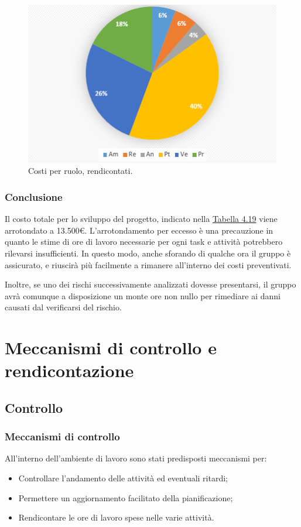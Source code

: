 \documentclass[a4paper]{article}
\begin{document}
				\begin{figure}[H]
					\centering
					\includegraphics[scale=0.7]{pc_costi_rendicontate}
					\caption{Costi per ruolo, rendicontati.}
				\end{figure}
				
			\subsubsection{Conclusione}
				Il costo totale per lo sviluppo del progetto, indicato nella \hyperref[TCRendicontati]{Tabella 4.19} viene 
				arrotondato a 13.500\euro. L'arrotondamento per eccesso è una precauzione in quanto le stime di ore di lavoro 
				necessarie per ogni task e attività potrebbero rilevarsi insufficienti. In questo modo, anche sforando di qualche 
				ora il gruppo è assicurato, e riuscirà più facilmente a rimanere all'interno dei costi preventivati.
				
				Inoltre, se uno dei rischi successivamente analizzati dovesse presentarsi, il gruppo avrà comunque a disposizione 
				un monte ore non nullo per rimediare ai danni causati dal verificarsi del rischio.

	\newpage 
	\section{Meccanismi di controllo e rendicontazione}
	
		\subsection{Controllo}
		
			\subsubsection{Meccanismi di controllo}
				All'interno dell'ambiente di lavoro sono stati predisposti meccanismi per:
				\begin{itemize}
					\item Controllare l'andamento delle attività ed eventuali ritardi;
					\item Permettere un aggiornamento facilitato della pianificazione;
					\item Rendicontare le ore di lavoro spese nelle varie attività.
				\end{itemize}
				
\end{document}

